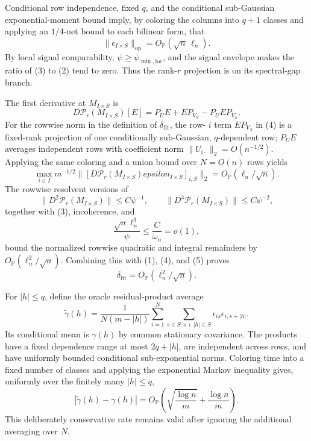 Conditional row independence, fixed \(q\), and the conditional sub-Gaussian exponential-moment bound imply, by coloring the columns into \(q+1\) classes and applying an \(1/4\)-net bound to each bilinear form, that
\[
 \|\epsilon_{I\times S}\|_{\mathrm{op}}=O_{\mathbb P}(\sqrt n\,\ell_n).
 \tag{3}
\]
By local signal comparability, \(\psi\ge\psi_{\min,\mathrm{loc}}\), and the signal envelope makes the ratio of (3) to (2) tend to zero.  Thus the rank-\(r\) projection is on its spectral-gap branch.

The first derivative at \(M_{I\times S}\) is
\[
 D\mathcal P_r(M_{I\times S})[E]
 =P_UE+EP_{V_S}-P_UEP_{V_S}.
 \tag{4}
\]
For the rowwise norm in the definition of \(\delta_{\mathrm{fit}}\), the row-
\(i\) term \(EP_{V_S}\) in (4) is a fixed-rank projection of one conditionally sub-Gaussian, \(q\)-dependent row; \(P_UE\) averages independent rows with coefficient norm \(\|U_{i\cdot}\|_2=O(n^{-1/2})\).  Applying the same coloring and a union bound over \(N=O(n)\) rows yields
\[
 \max_{i\in I}m^{-1/2}
 \|[D\mathcal P_r(M_{I\times S})epsilon_{I\times S}]_{i,S}\|_2
 =O_{\mathbb P}(\ell_n/\sqrt n).
 \tag{5}
\]
The rowwise resolvent versions of
\[
 \|D^2\mathcal P_r(M_{I\times S})\|\le C\psi^{-1},
 \qquad
 \|D^3\mathcal P_r(M_{I\times S})\|\le C\psi^{-2},
\]
together with (3), incoherence, and
\[
 \frac{\sqrt n\ell_n^3}{\psi}
 \le\frac{C}{\omega_n}=o(1),
 \tag{6}
\]
bound the normalized rowwise quadratic and integral remainders by \(O_{\mathbb P}(\ell_n^2/\sqrt n)\).  Combining this with (1), (4), and (5) proves
\[
 \delta_{\mathrm{fit}}=O_{\mathbb P}(\ell_n^2/\sqrt n).
 \tag{7}
\]

For \(|h|\le q\), define the oracle residual-product average
\[
 \widetilde\gamma(h)=\frac{1}{N(m-|h|)}
 \sum_{i=1}^N\sum_{s\in S:s+|h|\in S}
 \epsilon_{is}\epsilon_{i,s+|h|}.
\]
Its conditional mean is \(\gamma(h)\) by common stationary covariance.  The products have a fixed dependence range at most \(2q+|h|\), are independent across rows, and have uniformly bounded conditional sub-exponential norms.  Coloring time into a fixed number of classes and applying the exponential Markov inequality gives, uniformly over the finitely many \(|h|\le q\),
\[
 |\widetilde\gamma(h)-\gamma(h)|
 =O_{\mathbb P}\!\left(
 \sqrt{\frac{\log n}{m}}+\frac{\log n}{m}\right).
 \tag{8}
\]
This deliberately conservative rate remains valid after ignoring the additional averaging over \(N\).

